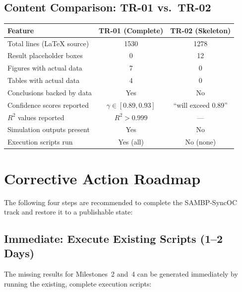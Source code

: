 \documentclass[12pt,a4paper]{article}
\begin{document}
\subsection{Content Comparison: TR-01 vs.\ TR-02}
\label{sec:rep:compare}

\begin{center}
\begin{tabular}{lcc}
\toprule
\textbf{Feature} & \textbf{TR-01 (Complete)} & \textbf{TR-02 (Skeleton)} \\
\midrule
Total lines (LaTeX source)     & 1530  & 1278 \\
Result placeholder boxes       & 0     & 12 \\
Figures with actual data       & 7     & 0 \\
Tables with actual data        & 4     & 0 \\
Conclusions backed by data     & Yes   & No \\
Confidence scores reported     & $\gamma \in [0.89, 0.93]$ & ``will exceed 0.89'' \\
$R^2$ values reported          & $R^2 > 0.999$ & --- \\
Simulation outputs present     & Yes   & No \\
Execution scripts run          & Yes (all) & No (none) \\
\bottomrule
\end{tabular}
\end{center}


\section{Corrective Action Roadmap}
\label{sec:corrective}

\begin{recommendbox}[title={Recommended Corrective Actions}]
The following four steps are recommended to complete the SAMBP-SyncOC track
and restore it to a publishable state:
\end{recommendbox}

\subsection{Immediate: Execute Existing Scripts (1--2 Days)}
\label{sec:cor:scripts}

The missing results for Milestones~2 and~4 can be generated immediately by
running the existing, complete execution scripts:
\end{document}
